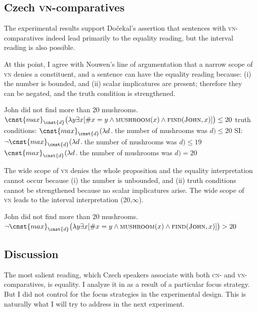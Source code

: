 \documentclass[output=paper,
]{langscibook}
\begin{document}
\subsection{Czech \textsc{vn-}comparatives}

The experimental results support Dočekal's assertion that sentences with \textsc{vn-}comparati\-ves indeed lead primarily to the equality reading, but the interval reading is also possible.

At this point, I agree with Nouwen's line of argumentation that a narrow scope of \textsc{vn}  denies a constituent, and a sentence can have the equality reading because: (i) the number is bounded, and (ii) scalar implicatures are present; therefore they can be negated, and the truth condition is strengthened. 

\ea  John did not find more than 20 mushrooms. 
	\ea $\cnst{max}_{\cnst{d}}\big(\lambda y\exists x[\#x=y \wedge \textsc{mushroom}(x) \wedge \textsc{find}(\textsc{John},x)]\big) \leq 20$ \label{ex:e_exh}
 \ex truth conditions: $\cnst{max}_{\cnst{d}}(\lambda d\,.\,$the number of mushrooms was $d)\leq 20$ \label{ex:tc}
	\ex SI: $\neg\cnst{max}_{\cnst{d}}(\lambda d\,.\,$the number of mushrooms was $d)\leq 19$ \label{ex:si}
	\ex $\cnst{max}_{\cnst{d}}(\lambda d\,.\,$the number of mushrooms was $d) = 20$ \label{ex:max}
\z
\z

\noindent The wide scope of \textsc{vn}  denies the whole proposition and the equality interpretation cannot occur because (i) the number is unbounded, and (ii) truth conditions cannot be strengthened because no scalar implicatures arise. The wide scope of \textsc{vn} leads to the interval interpretation (20,$\infty$).

\ea  John did not find more than 20 mushrooms. 
\ea $\neg \cnst{max}_{\cnst{d}}\big(\lambda y\exists x[\#x=y \wedge \textsc{mushroom}(x) \wedge \textsc{find}(\textsc{John},x)]\big) > 20$ \label{ex:e_int}
\z
\z

\subsection{Discussion}

The most salient reading, which Czech speakers associate with both \textsc{cn-} and \textsc{vn-}compa\-ratives, is equality. I analyze it in  as a result of a particular focus strategy. But I did not control for the focus strategies in the experimental design. This is naturally what I will try to address in the next experiment.
\end{document}
